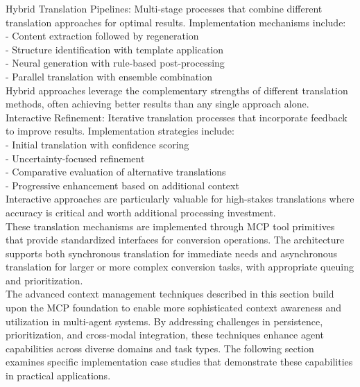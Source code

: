 Hybrid Translation Pipelines: Multi-stage processes that combine different translation approaches for optimal results. Implementation mechanisms include:\\ \newline
- Content extraction followed by regeneration\\ \newline
- Structure identification with template application\\ \newline
- Neural generation with rule-based post-processing\\ \newline
- Parallel translation with ensemble combination\\ \newline
Hybrid approaches leverage the complementary strengths of different translation methods, often achieving better results than any single approach alone.\\ \newline
Interactive Refinement: Iterative translation processes that incorporate feedback to improve results. Implementation strategies include:\\ \newline
- Initial translation with confidence scoring\\ \newline
- Uncertainty-focused refinement\\ \newline
- Comparative evaluation of alternative translations\\ \newline
- Progressive enhancement based on additional context\\ \newline
Interactive approaches are particularly valuable for high-stakes translations where accuracy is critical and worth additional processing investment.\\ \newline
These translation mechanisms are implemented through MCP tool primitives that provide standardized interfaces for conversion operations. The architecture supports both synchronous translation for immediate needs and asynchronous translation for larger or more complex conversion tasks, with appropriate queuing and prioritization.\\ \newline
The advanced context management techniques described in this section build upon the MCP foundation to enable more sophisticated context awareness and utilization in multi-agent systems. By addressing challenges in persistence, prioritization, and cross-modal integration, these techniques enhance agent capabilities across diverse domains and task types. The following section examines specific implementation case studies that demonstrate these capabilities in practical applications.\\ \newline
